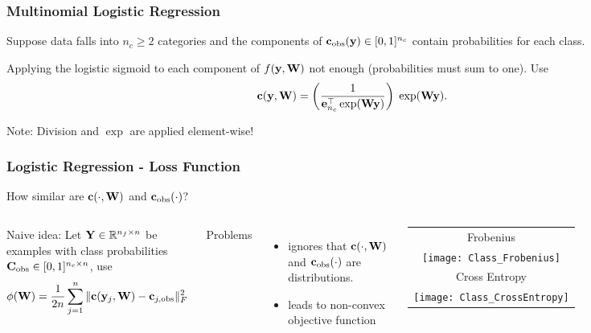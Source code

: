 \documentclass[12pt,fleqn,handout]{beamer}
\begin{document}
\begin{frame}
	\frametitle{Multinomial Logistic Regression}
	
	Suppose data falls into $n_c\geq 2$ categories and the components of ${\bf c}_{\rm obs}({\bf y}) \in[0,1]^{n_c}$ contain probabilities for each class. 
	
	\bigskip
	 
	Applying the logistic sigmoid to each component of $f({\bf y},{\bf W})$ not enough (probabilities must sum to one). Use
	$$
		{\bf c}({\bf y},{\bf W}) = \left( \frac{1}{{\bf e}_{n_c}^\top\exp({\bf W}{\bf y})} \right) \; \exp({\bf W}{\bf y}).
	$$
	
	\bigskip
	
	Note: Division and $\exp$ are applied element-wise!
	
\end{frame}
\begin{frame}
	\frametitle{Logistic Regression - Loss Function}
	
	How similar are ${\bf c}(\cdot,{\bf W})$ and ${\bf c}_{\rm obs}(\cdot)$?

	\begin{columns}
	Naive idea: Let ${\bf Y} \in \mathbb{R}^{n_f\times n}$ be examples with class probabilities ${\bf C}_{\rm obs} \in [0,1]^{n_c\times n}$, use 
	$$
	\phi({\bf W})= \frac{1}{2n} \sum_{j=1}^n\|{\bf c}({\bf y}_j,{\bf W}) - {\bf c}_{j,{\rm obs}} \|_F^2
	$$

Problems
\begin{itemize}
	\item ignores that ${\bf c}(\cdot,{\bf W})$ and ${\bf c}_{\rm obs}(\cdot)$ are distributions.
	\item leads to non-convex objective function
\end{itemize} 
		
		
		\begin{tabular}{c}
			Frobenius\\
			\texttt{[image: Class\_Frobenius]}\\
			Cross Entropy\\
			\texttt{[image: Class\_CrossEntropy]}
		\end{tabular}
	\end{columns}
	
\end{frame}
\end{document}
